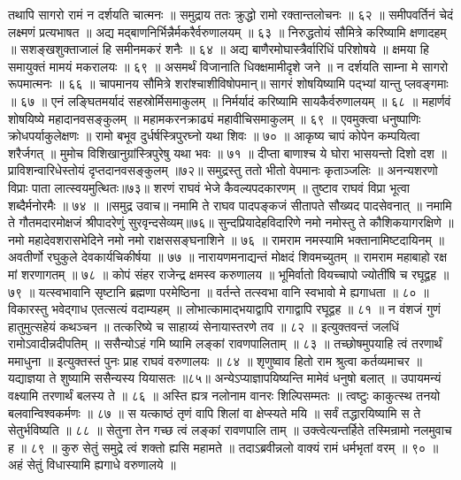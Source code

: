 तथापि सागरो रामं न दर्शयति चात्मनः ॥
समुद्राय ततः क्रुद्धो रामो रक्तान्तलोचनः ॥ ६२ ॥
समीपवर्तिनं चेदं लक्ष्मणं प्रत्यभाषत ॥
अद्य मद्बाणनिर्भिन्नैर्मकरैर्वरुणालयम् ॥ ६३ ॥
निरुद्धतोयं सौमित्रे करिष्यामि क्षणादहम् ॥
सशङ्खशुक्ताजालं हि समीनमकरं शनैः ॥ ६४ ॥
अद्य बाणैरमोघास्त्रैर्वारिधिं परिशोषये ॥
क्षमया हि समायुक्तं मामयं मकरालयः ॥ ६९ ॥
असमर्थं विजानाति धिक्क्षमामीदृशे जने ॥
न दर्शयति साम्ना मे सागरो रूपमात्मनः ॥ ६६ ॥
चापमानय सौमित्रे शरांश्चाशीविषोपमान्॥
सागरं शोषयिष्यामि पद्भ्यां यान्तु प्लवङ्गमाः ॥ ६७ ॥
एनं लङ्घितमर्यादं सहस्रोर्मिसमाकुलम् ॥
निर्मर्यादं करिष्यामि सायकैर्वरुणालयम् ॥ ६८ ॥
महार्णवं शोषयिष्ये महादानवसङ्कुलम् ॥
महामकरनक्राढ्यं महावीचिसमाकुलम् ॥ ६९ ॥
एवमुक्त्वा धनुष्पाणिः क्रोधपर्याकुलेक्षणः ॥
रामो बभूव दुर्धर्षस्त्रिपुरघ्नो यथा शिवः ॥ ७० ॥
आकृष्य चापं कोपेन कम्पयित्वा शरैर्जगत् ॥
मुमोच विशिखानुग्रांस्त्रिपुरेषु यथा भवः ॥ ७१ ॥
दीप्ता बाणाश्च ये घोरा भासयन्तो दिशो दश ॥
प्राविशन्वारिधेस्तोयं दृप्तदानवसङ्कुलम् ॥७२॥
समुद्रस्तु ततो भीतो वेपमानः कृताञ्जलिः ॥
अनन्यशरणो विप्राः पाता लात्स्वयमुत्थितः॥७३॥
शरणं राघवं भेजे कैवल्यपदकारणम् ॥
तुष्टाव राघवं विप्रा भूत्वा शब्दैर्मनोरमैः ॥ ७४ ॥
॥समुद्र उवाच॥
नमामि ते राघव पादपङ्कजं सीतापते सौख्यद पादसेवनात् ॥
नमामि ते गौतमदारमोक्षजं श्रीपादरेणुं सुरवृन्दसेव्यम्॥७६॥
सुन्दप्रियादेहविदारिणे नमो नमोस्तु ते कौशिकयागरक्षिणे ॥
नमो महादेवशरासभेदिने नमो नमो राक्षससङ्घनाशिने ॥ ७६ ॥
रामराम नमस्यामि भक्तानामिष्टदायिनम् ॥
अवतीर्णो रघुकुले देवकार्यचिकीर्षया ॥ ७७ ॥
नारायणमनाद्यन्तं मोक्षदं शिवमच्युतम् ॥
रामराम महाबाहो रक्ष मां शरणागतम् ॥ ७८ ॥
कोपं संहर राजेन्द्र क्षमस्व करुणालय ॥
भूमिर्वातो वियच्चापो ज्योतींषि च रघूद्वह ॥ ७९ ॥
यत्स्वभावानि सृष्टानि ब्रह्मणा परमेष्ठिना ॥
वर्तन्ते तत्स्वभा वानि स्वभावो मे ह्यगाधता ॥ ८० ॥
विकारस्तु भवेद्गाध एतत्सत्यं वदाम्यहम् ॥
लोभात्कामाद्भयाद्वापि रागाद्वापि रघूद्वह ॥ ८१ ॥
न वंशजं गुणं हातुमुत्सहेयं कथञ्चन ॥
तत्करिष्ये च साहाय्यं सेनायास्तरणे तव ॥ ८२ ॥
इत्युक्तवन्तं जलधिं रामोऽवादीन्नदीपतिम् ॥
ससैन्योऽहं गमि ष्यामि लङ्कां रावणपालिताम् ॥ ८३ ॥
तच्छोषमुपयाहि त्वं तरणार्थं ममाधुना ॥
इत्युक्तस्तं पुनः प्राह राघवं वरुणालयः ॥ ८४ ॥
शृणुष्वाव हितो राम श्रुत्वा कर्तव्यमाचर ॥
यद्याज्ञया ते शुष्यामि ससैन्यस्य यियासतः ॥८५॥
अन्येऽप्याज्ञापयिष्यन्ति मामेवं धनुषो बलात् ॥
उपायमन्यं वक्ष्यामि तरणार्थं बलस्य ते ॥ ८६ ॥
अस्ति ह्यत्र नलोनाम वानरः शिल्पिसम्मतः ॥
त्वष्टुः काकुत्स्थ तनयो बलवान्विश्वकर्मणः ॥ ८७ ॥
स यत्काष्ठं तृणं वापि शिलां वा क्षेप्स्यते मयि ॥
सर्वं तद्धारयिष्यामि स ते सेतुर्भविष्यति ॥ ८८ ॥
सेतुना तेन गच्छ त्वं लङ्कां रावणपालि ताम् ॥
उक्त्वेत्यन्तर्हिते तस्मिन्रामो नलमुवाच ह ॥ ८९ ॥
कुरु सेतुं समुद्रे त्वं शक्तो ह्यसि महामते ॥
तदाऽब्रवीन्नलो वाक्यं रामं धर्मभृतां वरम् ॥ ९० ॥
अहं सेतुं विधास्यामि ह्यगाधे वरुणालये ॥

